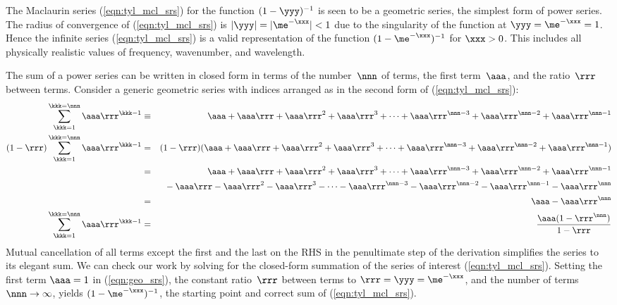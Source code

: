 \documentclass[12pt]{article}
\begin{document}
The Maclaurin series (\ref{eqn:tyl_mcl_srs}) for the function $(1 - \yyy)^{-1}$ is seen to be a geometric series, the simplest form of power series.
The radius of convergence of (\ref{eqn:tyl_mcl_srs}) is $|\yyy| = |\me^{-\xxx}| < 1$ due to the singularity of the function at $\yyy = \me^{-\xxx} = 1$.
Hence the infinite series (\ref{eqn:tyl_mcl_srs}) is a valid representation of the function $(1 - \me^{-\xxx})^{-1}$ for $\xxx > 0$.
This includes all physically realistic values of frequency, wavenumber, and wavelength.

The sum of a power series can be written in closed form in terms of the number~$\nnn$ of terms, the first term~$\aaa$, and the ratio~$\rrr$ between terms.
Consider a generic geometric series with indices arranged as in the second form of (\ref{eqn:tyl_mcl_srs}):
\begin{eqnarray}
\sum_{\kkk=1}^{\kkk=\nnn} \aaa\rrr^{\kkk - 1}
& \equiv & \aaa + \aaa\rrr + \aaa\rrr^{2} + \aaa\rrr^{3} + \cdots + \aaa\rrr^{\nnn-3} + \aaa\rrr^{\nnn-2} + \aaa\rrr^{\nnn-1} \nonumber \\ 
(1 - \rrr)\sum_{\kkk=1}^{\kkk=\nnn} \aaa\rrr^{\kkk - 1} 
& = &
(1 - \rrr) ( \aaa + \aaa\rrr + \aaa\rrr^{2} + \aaa\rrr^{3} + \cdots + \aaa\rrr^{\nnn-3} + \aaa\rrr^{\nnn-2} + \aaa\rrr^{\nnn-1} ) \nonumber \\
& = &
\aaa + \aaa\rrr + \aaa\rrr^{2} + \aaa\rrr^{3} + \cdots + \aaa\rrr^{\nnn-3} +\aaa\rrr^{\nnn-2} + \aaa\rrr^{\nnn-1} \nonumber \\
& & {} \mkern8mu - \aaa\rrr - \aaa\rrr^{2} - \aaa\rrr^{3} - \cdots - \aaa\rrr^{\nnn-3} -\aaa\rrr^{\nnn-2} - \aaa\rrr^{\nnn-1} - \aaa\rrr^{\nnn} \nonumber \\
& = & \aaa - \aaa\rrr^{\nnn} \nonumber \\
\sum_{\kkk=1}^{\kkk=\nnn} \aaa\rrr^{\kkk - 1}
& = & \frac{\aaa (1 - \rrr^{\nnn})}{1 - \rrr}
\label{eqn:geo_srs}
\end{eqnarray}
Mutual cancellation of all terms except the first and the last on the RHS in the penultimate step of the derivation simplifies the series to its elegant sum.
We can check our work by solving for the closed-form summation of the series of interest (\ref{eqn:tyl_mcl_srs}).
Setting the first term $\aaa = 1$ in (\ref{eqn:geo_srs}), the constant ratio~$\rrr$ between terms to $\rrr = \yyy = \me^{-\xxx}$, and the number of terms $\nnn \rightarrow \infty$, yields $(1-\me^{-\xxx})^{-1}$, the starting point and correct sum of (\ref{eqn:tyl_mcl_srs}).
\end{document}
